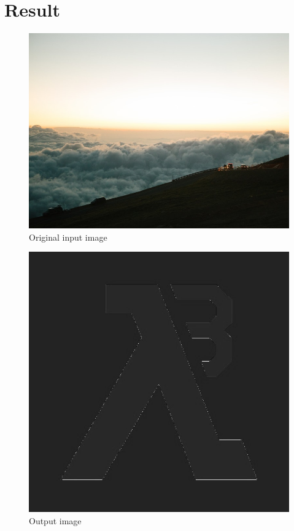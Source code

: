 \documentclass{article}
\begin{document}
\section*{Result}
\begin{figure}[h]
\center\includegraphics[scale=0.3]{../labwork/data/cloud.jpeg}
\caption{Original input image}
\end{figure}
\begin{figure}[h]
\center\includegraphics[scale=0.3]{../labwork/build/labwork3-gpu-out.jpg}
\caption{Output image}
\end{figure}
\end{document}
